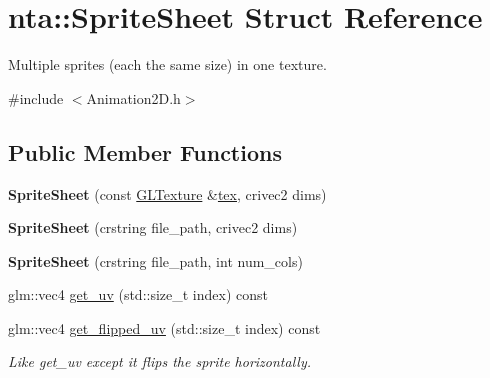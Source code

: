 \hypertarget{structnta_1_1SpriteSheet}{}\section{nta\+:\+:Sprite\+Sheet Struct Reference}
\label{structnta_1_1SpriteSheet}


Multiple sprites (each the same size) in one texture.  




{\ttfamily \#include $<$Animation2\+D.\+h$>$}

\subsection*{Public Member Functions}
\begin{DoxyCompactItemize}
\item 
\mbox{\label{structnta_1_1SpriteSheet_acb0a6cab5e60d26a8e00d1e78974456b}} 
{\bfseries Sprite\+Sheet} (const \hyperlink{namespacenta_d3/dff/structnta_1_1GLTexture}{G\+L\+Texture} \&\hyperlink{structnta_1_1SpriteSheet_a6c55217abab2dbd76b61ad92fe902367}{tex}, crivec2 dims)
\item 
\mbox{\label{structnta_1_1SpriteSheet_aca9119d89a8c2c9e8e88cc43844c264a}} 
{\bfseries Sprite\+Sheet} (crstring file\+\_\+path, crivec2 dims)
\item 
\mbox{\label{structnta_1_1SpriteSheet_a68232c976caa805754f7b3863129ee09}} 
{\bfseries Sprite\+Sheet} (crstring file\+\_\+path, int num\+\_\+cols)
\item 
glm\+::vec4 \hyperlink{structnta_1_1SpriteSheet_a618bc48e6978a19ad9eb56dda3307f5a}{get\+\_\+uv} (std\+::size\+\_\+t index) const
\item 
\mbox{\label{structnta_1_1SpriteSheet_a98643a92390617ac5575b7a951e9805a}} 
glm\+::vec4 \hyperlink{structnta_1_1SpriteSheet_a98643a92390617ac5575b7a951e9805a}{get\+\_\+flipped\+\_\+uv} (std\+::size\+\_\+t index) const
\begin{DoxyCompactList}\small\item\em Like get\+\_\+uv except it flips the sprite horizontally. \end{DoxyCompactList}\end{DoxyCompactItemize}
